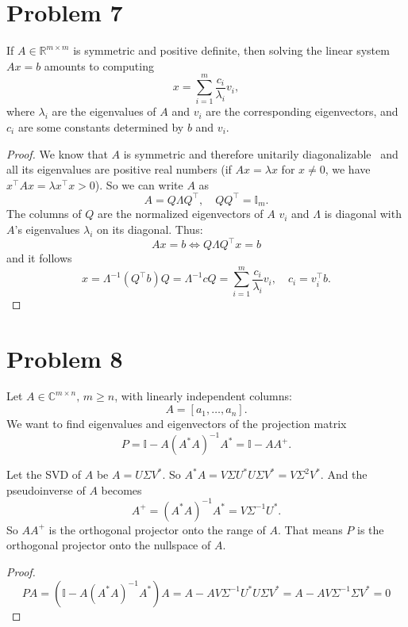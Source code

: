 \documentclass[a4paper, 11pt]{article}
\begin{document}
\section*{Problem 7}
If $A \in \mathbb{R}^{m \times m}$ is symmetric and positive definite, then
solving the linear system $Ax = b$ amounts to computing
\begin{equation*}
  x = \sum_{i = 1}^m \frac{c_i}{\lambda_i}v_i, 
\end{equation*}
where $\lambda_i$ are the eigenvalues of $A$ and $v_i$ are the corresponding
eigenvectors, and $c_i$ are some constants determined by $b$ and $v_i$.
\begin{proof}
  We know that $A$ is symmetric and therefore unitarily
  diagonalizable~\cite[Theorem 24.7]{tb} and all its eigenvalues are positive
  real numbers (if $Ax = \lambda x$ for $x \neq 0$, we have $x^\top A x =
  \lambda x^\top x > 0$). 
  So we can write $A$ as
  \begin{equation*}
    A = Q \Lambda Q^\top, \quad QQ^\top = \mathbb{I}_m.
  \end{equation*}
  The columns of $Q$ are the normalized eigenvectors of $A$ $v_i$ and $\Lambda$
  is diagonal with $A$'s eigenvalues $\lambda_i$ on its diagonal. Thus:
  \begin{equation*}
    Ax = b \Leftrightarrow Q\Lambda Q^\top x = b
  \end{equation*}
  and it follows
  \begin{equation*}
    x = \Lambda^{-1}(Q^\top b) Q = \Lambda^{-1}c Q = \sum_{i = 1}^m \frac{c_i}{\lambda_i} v_i, \quad c_i = v_i^\top b.
  \end{equation*}
\end{proof}

\section*{Problem 8}
Let $A \in \mathbb{C}^{m \times n}, \, m \geq n$, with linearly independent columns:
\begin{equation*}
  A = [a_1, \dots, a_n].
\end{equation*}
We want to find eigenvalues and eigenvectors of the projection matrix
\begin{equation*}
  P = \mathbb{I} - A(A^*A)^{-1}A^* = \mathbb{I} - AA^+.
\end{equation*}

Let the SVD of $A$ be $A = U \Sigma V^*$. So $A^*A = V\Sigma U^*U \Sigma V^* = V \Sigma^2 V^*$. And the pseudoinverse of $A$ becomes
\begin{equation*}
  A^+ = (A^*A)^{-1}A^* = V \Sigma^{-1} U^*.
\end{equation*}
So $AA^+$ is the orthogonal projector onto the range of $A$. That means $P$
is the orthogonal projector onto the nullspace of $A$.
\begin{proof}
  \begin{equation*}
    P A = (\mathbb{I} - A(A^*A)^{-1}A^*)A = A - A V\Sigma^{-1} U^*U \Sigma V^* = A -
    AV\Sigma^{-1}\Sigma V^* = 0
  \end{equation*}
\end{proof}
\end{document}
